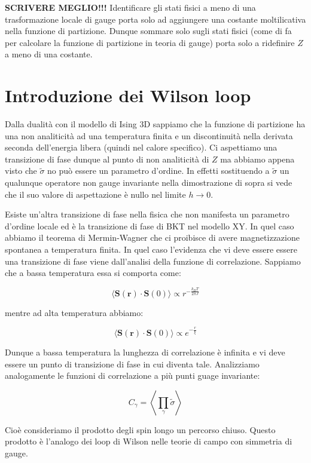 \documentclass[12pt,a4paper]{article}
\begin{document}
\textbf{SCRIVERE MEGLIO!!!}
Identificare gli stati fisici a meno di una trasformazione locale di gauge porta solo ad aggiungere una costante moltilicativa nella funzione di partizione. Dunque sommare solo sugli stati fisici (come di fa per calcolare la funzione di partizione in teoria di gauge) porta solo a ridefinire $Z$ a meno di una costante.

\section{Introduzione dei Wilson loop}

Dalla dualità con il modello di Ising 3D sappiamo che la funzione di partizione ha una non analiticità ad una temperatura finita e un discontinuità nella derivata seconda dell'energia libera (quindi nel calore specifico). Ci aspettiamo una transizione di fase dunque al punto di non analiticità di $Z$ ma abbiamo appena visto che $\tilde{\sigma}$ no può essere un parametro d'ordine.
In effetti sostituendo a $\tilde{\sigma}$ un qualunque operatore non gauge invariante nella dimostrazione di sopra si vede che il suo valore di aspettazione è nullo nel limite $h \rightarrow 0$. 

Esiste un'altra transizione di fase nella fisica che non manifesta un parametro d'ordine locale ed è la transizione di fase di BKT nel modello XY. In quel caso abbiamo il teorema di Mermin-Wagner che ci proibisce di avere magnetizzazione spontanea a temperatura finita. In quel caso l'evidenza che vi deve essere essere una transizione di fase viene dall'analisi della funzione di correlazione. Sappiamo che a bassa temperatura essa si comporta come:

\[
\langle \mathbf{S}(\mathbf{r}) \cdot \mathbf{S}(0) \rangle \propto r^{-\frac{k_B T}{2 \pi J}}
\]

mentre ad alta temperatura abbiamo:

\[
\langle \mathbf{S}(\mathbf{r}) \cdot \mathbf{S}(0) \rangle \propto e^{-\frac{r}{\xi}}
\]

Dunque a bassa temperatura la lunghezza di correlazione è infinita e vi deve essere un punto di transizione di fase in cui diventa tale. 
Analizziamo analogamente le funzioni di correlazione a più punti guage invariante:

\begin{equation}
C_{\gamma}= \left< \prod_{\gamma} \tilde{\sigma} \right>
\end{equation}

Cioè consideriamo il prodotto degli spin longo un percorso chiuso. Questo prodotto è l'analogo dei loop di Wilson nelle teorie di campo con simmetria di gauge. 
\end{document}
